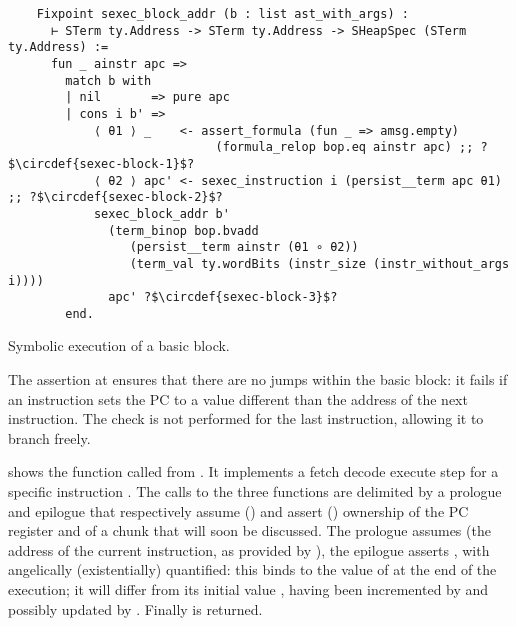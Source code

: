 \begin{listing}[htb]
  \startcstep
  \begin{verbatim}
    Fixpoint sexec_block_addr (b : list ast_with_args) :
      ⊢ STerm ty.Address -> STerm ty.Address -> SHeapSpec (STerm ty.Address) :=
      fun _ ainstr apc =>
        match b with
        | nil       => pure apc
        | cons i b' =>
            ⟨ θ1 ⟩ _    <- assert_formula (fun _ => amsg.empty)
                             (formula_relop bop.eq ainstr apc) ;; ?$\circdef{sexec-block-1}$?
            ⟨ θ2 ⟩ apc' <- sexec_instruction i (persist__term apc θ1) ;; ?$\circdef{sexec-block-2}$?
            sexec_block_addr b'
              (term_binop bop.bvadd
                 (persist__term ainstr (θ1 ∘ θ2))
                 (term_val ty.wordBits (instr_size (instr_without_args i))))
              apc' ?$\circdef{sexec-block-3}$?
        end.
  \end{verbatim}
  \caption{Symbolic execution of a basic block.}
  \label{lst:sexec-block}
\end{listing}

The assertion at  ensures that there are no jumps within the basic block: it fails if an instruction sets the PC to a value different than the address of the next instruction. The check is not performed for the last instruction, allowing it to branch freely.


 shows the  function called from . It implements a fetch  decode  execute  step for a specific instruction . The calls to the three functions are delimited by a prologue and epilogue  that respectively assume () and assert () ownership of the PC register and of a  chunk that will soon be discussed. The prologue assumes  (the address of the current instruction, as provided by ), the epilogue asserts , with  angelically (existentially) quantified: this binds  to the value of  at the end of the execution; it will differ from its initial value , having been incremented by  and possibly updated by . Finally  is returned.

